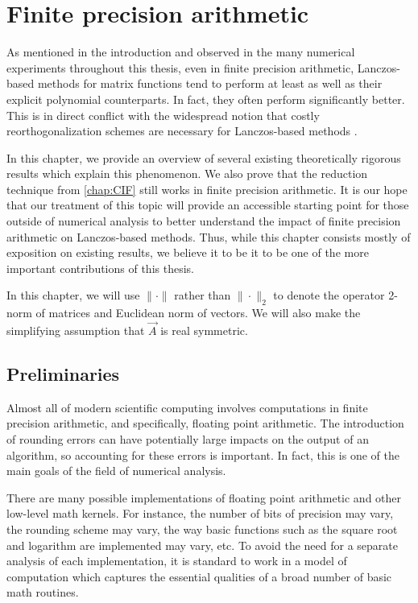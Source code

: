 \chapter{Finite precision arithmetic}
\label{chap:finite_precision}

As mentioned in the introduction and observed in the many numerical experiments throughout this thesis, even in finite precision arithmetic, Lanczos-based methods for matrix functions tend to perform at least as well as their explicit polynomial counterparts.
In fact, they often perform significantly better.
This is in direct conflict with the widespread notion that costly reorthogonalization schemes are necessary for Lanczos-based methods \cite{jaklic_prelovsek_94,aichhorn_daghofer_evertz_vondelinden_03,weisse_wellein_alvermann_fehske_06,ubaru_chen_saad_17,granziol_wan_garipov_19}.

In this chapter, we provide an overview of several existing theoretically rigorous results which explain this phenomenon.
We also prove that the reduction technique from \cref{chap:CIF} still works in finite precision arithmetic.
It is our hope that our treatment of this topic will provide an accessible starting point for those outside of numerical analysis to better understand the impact of finite precision arithmetic on Lanczos-based methods.
Thus, while this chapter consists mostly of exposition on existing results, we believe it to be it to be one of the more important contributions of this thesis.

In this chapter, we will use \( \| \cdot \| \) rather than \( \| \cdot \|_2 \) to denote the operator 2-norm of matrices and Euclidean norm of vectors.
We will also make the simplifying assumption that \( \vec{A} \) is real symmetric.


\section{Preliminaries}

Almost all of modern scientific computing involves computations in finite precision arithmetic, and specifically, floating point arithmetic.
The introduction of rounding errors can have potentially large impacts on the output of an algorithm, so accounting for these errors is important. 
In fact, this is one of the main goals of the field of numerical analysis.

There are many possible implementations of floating point arithmetic and other low-level math kernels.
For instance, the number of bits of precision may vary, the rounding scheme may vary, the way basic functions such as the square root and logarithm are implemented may vary, etc.
To avoid the need for a separate analysis of each implementation, it is standard to work in a model of computation which captures the essential qualities of a broad number of basic math routines.

